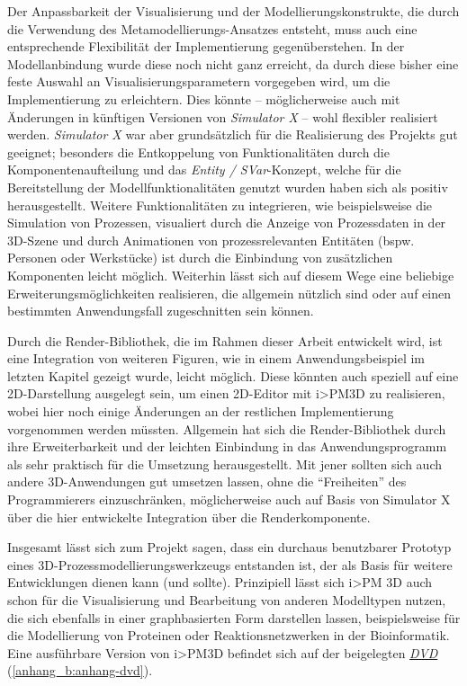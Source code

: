 \documentclass[a4paper,10pt]{sphinxmanual}
\begin{document}
Der Anpassbarkeit der Visualisierung und der Modellierungskonstrukte, die durch die Verwendung des Metamodellierungs-Ansatzes entsteht, muss auch eine entsprechende Flexibilität der Implementierung gegenüberstehen.
In der Modellanbindung wurde diese noch nicht ganz erreicht, da durch diese bisher eine feste Auswahl an Visualisierungsparametern vorgegeben wird, um die Implementierung zu erleichtern.
Dies könnte – möglicherweise auch mit Änderungen in künftigen Versionen von \emph{Simulator X} – wohl flexibler realisiert werden.
\emph{Simulator X} war aber grundsätzlich für die Realisierung des Projekts gut geeignet; besonders die Entkoppelung von Funktionalitäten durch die Komponentenaufteilung und das \emph{Entity / SVar}-Konzept, welche für die Bereitstellung der Modellfunktionalitäten genutzt wurden haben sich als positiv herausgestellt.
Weitere Funktionalitäten zu integrieren, wie beispielsweise die Simulation von Prozessen, visualiert durch die Anzeige von Prozessdaten in der 3D-Szene und durch Animationen von prozessrelevanten Entitäten (bspw. Personen oder Werkstücke) ist durch die Einbindung von zusätzlichen Komponenten leicht möglich. Weiterhin lässt sich auf diesem Wege eine beliebige Erweiterungsmöglichkeiten realisieren, die allgemein nützlich sind oder auf einen bestimmten Anwendungsfall zugeschnitten sein können.

Durch die Render-Bibliothek, die im Rahmen dieser Arbeit entwickelt wird, ist eine Integration von weiteren Figuren, wie in einem Anwendungsbeispiel im letzten Kapitel gezeigt wurde, leicht möglich.
Diese könnten auch speziell auf eine 2D-Darstellung ausgelegt sein, um einen 2D-Editor mit i\textgreater{}PM3D zu realisieren, wobei hier noch einige Änderungen an der restlichen Implementierung vorgenommen werden müssten.
Allgemein hat sich die Render-Bibliothek durch ihre Erweiterbarkeit und der leichten Einbindung in das Anwendungsprogramm als sehr praktisch für die Umsetzung herausgestellt.
Mit jener sollten sich auch andere 3D-Anwendungen gut umsetzen lassen, ohne die "`Freiheiten"' des Programmierers einzuschränken, möglicherweise auch auf Basis von Simulator X über die hier entwickelte Integration über die Renderkomponente.

Insgesamt lässt sich zum Projekt sagen, dass ein durchaus benutzbarer Prototyp eines 3D-Prozessmodellierungswerkzeugs entstanden ist, der als Basis für weitere Entwicklungen dienen kann (und sollte). Prinzipiell lässt sich i\textgreater{}PM 3D auch schon für die Visualisierung und Bearbeitung von anderen Modelltypen nutzen, die sich ebenfalls in einer graphbasierten Form darstellen lassen, beispielsweise für die Modellierung von Proteinen oder Reaktionsnetzwerken in der Bioinformatik.
Eine ausführbare Version von i\textgreater{}PM3D befindet sich auf der beigelegten {\hyperref[anhang_b:anhang-dvd]{\emph{DVD}}} (\autoref*{anhang_b:anhang-dvd}).
\printbibheading[heading=bibintoc, title={Literaturverzeichnis}]
\printbibliography[nottype=online,heading=subbibintoc,title={Literatur}]
\printbibliography[type=online,heading=subbibintoc,title={WWW-Referenzen}]\appendix
\end{document}
